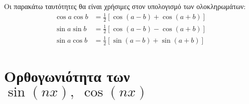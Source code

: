 \begin{rem}
  Οι παρακάτω ταυτότητες θα είναι χρήσιμες στον υπολογισμό των ολοκληρωμάτων:
  \begin{align*}
    \cos{a} \cos{b} &= \frac{1}{2} [\cos{(a-b)} + \cos{(a+b)}] \\ 
    \sin{a} \sin{b} &= \frac{1}{2} [\cos{(a-b)} - \cos{(a+b)}] \\
    \sin{a} \cos{b} &= \frac{1}{2} [\sin{(a-b)} + \sin{(a+b)}]
  \end{align*} 
\end{rem}


\section*{Ορθογωνιότητα των \ensuremath{\sin{(nx)}, \; \cos{(nx)}}}

